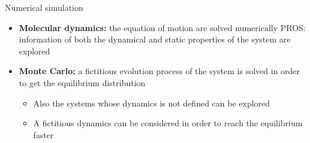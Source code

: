 \documentclass{beamer}
\begin{document}
\begin{frame}{Numerical simulation \cite{peliti2011statistical}}
\begin{itemize}
\item\textbf{Molecular dynamics:} the equation of motion are solved numerically PROS: information of both the dynamical and static properties of the system are explored 
\item\textbf{Monte Carlo:} a fictitious evolution process of the system is solved in order to get the equilibrium distribution
  \begin{itemize}
  \item Also the systems whose dynamics is not defined can be explored
  \item A fictitious dynamics can be considered in order to reach the equilibrium faster 
  \end{itemize} 
\end{itemize}
\end{frame}
\end{document}
